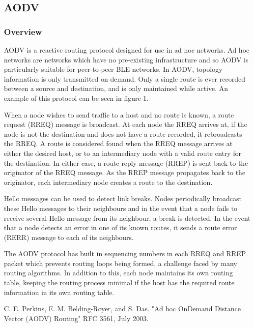       \subsection{AODV}
      \subsubsection{Overview}
      AODV is a reactive routing protocol designed for use in ad hoc networks.
      Ad hoc networks are networks which have no pre-existing infrastructure and
      so AODV is particularly suitable for peer-to-peer BLE networks. In AODV,
      topology information is only transmitted on demand. Only a single route is
      ever recorded between a source and destination, and is only maintained while
      active. An example of this protocol can be seen in figure 1.

      When a node wishes to send traffic to a host and no route is known, a route
      request (RREQ) message is broadcast. At each node the RREQ arrives at, if
      the node is not the destination and does not have a route recorded, it
      rebroadcasts the RREQ. A route is considered found when the RREQ message
      arrives at either the desired host, or to an intermediary node with a valid
      route entry for the destination. In either case, a route reply message (RREP)
      is sent back to the originator of the RREQ message. As the RREP message
      propagates back to the originator, each intermediary node creates a route
      to the destination.

      Hello messages can be used to detect link breaks. Nodes periodically
      broadcast these Hello messages to their neighbours and in the event that a
      node fails to receive several Hello message from its neighbour, a break is
      detected. In the event that a node detects an error in one of its known
      routes, it sends a route error (RERR) message to each of its neighbours.

      The AODV protocol has built in sequencing numbers in each RREQ and RREP
      packet which prevents routing loops being formed, a challenge faced by many
      routing algorithms. In addition to this, each node maintains its own routing
      table, keeping the routing process minimal if the host has the required
      route information in its own routing table.

      C. E. Perkins, E. M. Belding-Royer, and S. Das. "Ad hoc OnDemand Distance
      Vector (AODV) Routing" RFC 3561, July 2003.

